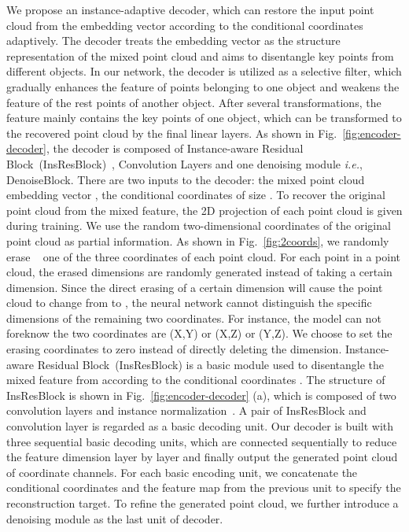 \documentclass[journal]{IEEEtran}
\def\ie{\emph{i.e.}}
\begin{document}
We propose an instance-adaptive decoder, which can restore the input point cloud from the embedding vector according to the conditional coordinates adaptively. The decoder treats the embedding vector as the structure representation of the mixed point cloud and aims to disentangle key points from different objects. In our network, the decoder is utilized as a selective filter, which gradually enhances the feature of points belonging to one object and weakens the feature of the rest points of another object. After several transformations, the feature mainly contains the key points of one object, which can be transformed to the recovered point cloud by the final linear layers. As shown in Fig.~\ref{fig:encoder-decoder}, the decoder is composed of Instance-aware Residual Block~(InsResBlock)~\cite{huang2017arbitrary},  Convolution Layers and one denoising module \ie, DenoiseBlock. There are two inputs to the decoder: the mixed point cloud embedding vector , the conditional coordinates  of size .
To recover the original point cloud from the mixed feature, the 2D projection  of each point cloud is given during training.
We use the random two-dimensional coordinates of the original point cloud as partial information. As shown in Fig.~\ref{fig:2coords}, we randomly erase ~\cite{zhong2020random} one of the three coordinates of each point cloud. For each point in a point cloud, the erased dimensions are randomly generated instead of taking a certain dimension. Since the direct erasing of a certain dimension will cause the point cloud to change from  to , the neural network cannot distinguish the specific dimensions of the remaining two coordinates. For instance, the model can not foreknow the two coordinates are (X,Y) or (X,Z) or (Y,Z).
We choose to set the erasing coordinates to zero instead of directly deleting the dimension. Instance-aware Residual Block~(InsResBlock) is a basic module used to disentangle the mixed feature from  according to the conditional coordinates . The structure of InsResBlock is shown in Fig.~\ref{fig:encoder-decoder} (a), which is composed of two convolution layers and instance normalization~\cite{ulyanov2016instance}.
A pair of InsResBlock and  convolution layer is regarded as a basic decoding unit. 
Our decoder  is built with three sequential basic decoding units, which are connected sequentially to reduce the feature dimension layer by layer and finally output the generated point cloud of  coordinate channels. For each basic encoding unit, we concatenate the conditional coordinates and the feature map from the previous unit to specify the reconstruction target. To refine the generated point cloud, we further introduce a denoising module as the last unit of decoder.  
\end{document}
